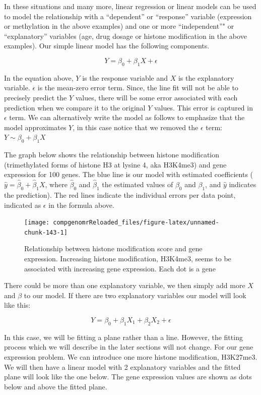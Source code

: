 \documentclass[12pt,]{krantz}
\theoremstyle{definition}
\theoremstyle{definition}
\theoremstyle{definition}
\theoremstyle{remark}
\begin{document}
In these situations and many more, linear regression or linear models
can be used to model the relationship with a ``dependent'' or
``response'' variable (expression or methylation in the above examples)
and one or more ``independent''" or ``explanatory'' variables (age, drug
dosage or histone modification in the above examples). Our simple linear
model has the following components.

\[  Y= \beta_0+\beta_1X + \epsilon \]

In the equation above, \(Y\) is the response variable and \(X\) is the
explanatory variable. \(\epsilon\) is the mean-zero error term. Since,
the line fit will not be able to precisely predict the \(Y\) values,
there will be some error associated with each prediction when we compare
it to the original \(Y\) values. This error is captured in \(\epsilon\)
term. We can alternatively write the model as follows to emphasize that
the model approximates \(Y\), in this case notice that we removed the
\(\epsilon\) term: \(Y \sim \beta_0+\beta_1X\)

The graph below shows the relationship between histone modification
(trimethylated forms of histone H3 at lysine 4, aka H3K4me3) and gene
expression for 100 genes. The blue line is our model with estimated
coefficients (\(\hat{y}=\hat{\beta}_0 + \hat{\beta}_1X\), where
\(\hat{\beta}_0\) and \(\hat{\beta}_1\) the estimated values of
\(\beta_0\) and \(\beta_1\), and \(\hat{y}\) indicates the prediction).
The red lines indicate the individual errors per data point, indicated
as \(\epsilon\) in the formula above.

\begin{figure}

{\centering \texttt{[image: compgenomrReloaded\_files/figure-latex/unnamed-chunk-143-1]} 

}

\caption{Relationship between histone modification score and gene expression. Increasing histone modification, H3K4me3, seems to be associated with increasing gene expression. Each dot is a gene}\label{fig:unnamed-chunk-143}
\end{figure}

There could be more than one explanatory variable, we then simply add
more \(X\) and \(\beta\) to our model. If there are two explanatory
variables our model will look like this:

\[  Y= \beta_0+\beta_1X_1 +\beta_2X_2 + \epsilon \]

In this case, we will be fitting a plane rather than a line. However,
the fitting process which we will describe in the later sections will
not change. For our gene expression problem. We can introduce one more
histone modification, H3K27me3. We will then have a linear model with 2
explanatory variables and the fitted plane will look like the one below.
The gene expression values are shown as dots below and above the fitted
plane.
\end{document}
